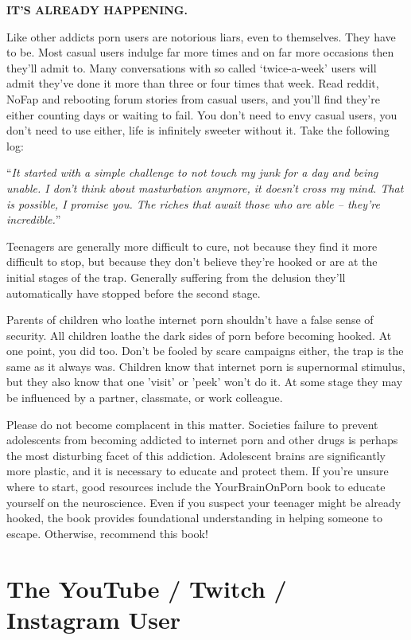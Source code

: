 \documentclass[
]{book}
\begin{document}
\textbf{IT'S ALREADY HAPPENING.}

Like other addicts porn users are notorious liars, even to themselves. They have to be. Most casual users indulge far more times and on far more occasions then they'll admit to. Many conversations with so called `twice-a-week' users will admit they've done it more than three or four times that week. Read reddit, NoFap and rebooting forum stories from casual users, and you'll find they're either counting days or waiting to fail. You don't need to envy casual users, you don't need to use either, life is infinitely sweeter without it. Take the following log:

``\emph{It started with a simple challenge to not touch my junk for a day and being unable. I don't think about masturbation anymore, it doesn't cross my mind. That is possible, I promise you. The riches that await those who are able -- they're incredible.}''

Teenagers are generally more difficult to cure, not because they find it more difficult to stop, but because they don't believe they're hooked or are at the initial stages of the trap. Generally suffering from the delusion they'll automatically have stopped before the second stage.

Parents of children who loathe internet porn shouldn't have a false sense of security. All children loathe the dark sides of porn before becoming hooked. At one point, you did too. Don't be fooled by scare campaigns either, the trap is the same as it always was. Children know that internet porn is supernormal stimulus, but they also know that one 'visit' or 'peek' won't do it. At some stage they may be influenced by a partner, classmate, or work colleague.

Please do not become complacent in this matter. Societies failure to prevent adolescents from becoming addicted to internet porn and other drugs is perhaps the most disturbing facet of this addiction. Adolescent brains are significantly more plastic, and it is necessary to educate and protect them. If you're unsure where to start, good resources include the YourBrainOnPorn book to educate yourself on the neuroscience. Even if you suspect your teenager might be already hooked, the book provides foundational understanding in helping someone to escape. Otherwise, recommend this book!

\hypertarget{the-youtube-twitch-instagram-user}{%
\chapter{The YouTube / Twitch / Instagram User}\label{the-youtube-twitch-instagram-user}}
\end{document}
